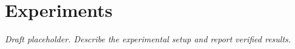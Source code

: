 \section{Experiments}
\label{sec:experiments}
\emph{Draft placeholder. Describe the experimental setup and report verified results.}
